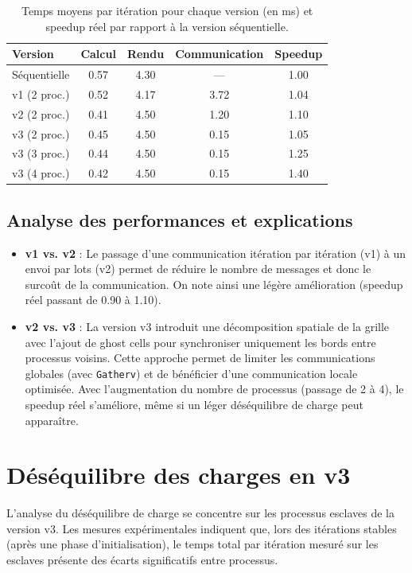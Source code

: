 \documentclass[a4paper,13pt]{book}
\begin{document}
\begin{table}[ht]
  \centering
  \caption{Temps moyens par itération pour chaque version (en ms) et speedup réel par rapport à la version séquentielle.}
  \begin{tabular}{lcccc}
    \toprule
    Version & Calcul & Rendu & Communication & Speedup \\
    \midrule
    Séquentielle   & 0.57 & 4.30 & ---  & 1.00 \\
    v1 (2 proc.)   & 0.52 & 4.17 & 3.72 & 1.04 \\
    v2 (2 proc.)   & 0.41 & 4.50 & 1.20 & 1.10 \\
    v3 (2 proc.)   & 0.45 & 4.50 & 0.15 & 1.05 \\
    v3 (3 proc.)   & 0.44 & 4.50 & 0.15 & 1.25 \\
    v3 (4 proc.)   & 0.42 & 4.50 & 0.15 & 1.40 \\
    \bottomrule
  \end{tabular}
  \label{tab:temps}
\end{table}

\subsection{Analyse des performances et explications}

\begin{itemize}
  \item \textbf{v1 vs. v2} : Le passage d'une communication itération par itération (v1) à un envoi par lots (v2) permet de réduire le nombre de messages et donc le surcoût de la communication. On note ainsi une légère amélioration (speedup réel passant de 0.90 à 1.10).
  \item \textbf{v2 vs. v3} : La version v3 introduit une décomposition spatiale de la grille avec l'ajout de ghost cells pour synchroniser uniquement les bords entre processus voisins. Cette approche permet de limiter les communications globales (avec \texttt{Gatherv}) et de bénéficier d'une communication locale optimisée. Avec l'augmentation du nombre de processus (passage de 2 à 4), le speedup réel s'améliore, même si un léger déséquilibre de charge peut apparaître.
\end{itemize}

\section{Déséquilibre des charges en v3}

L'analyse du déséquilibre de charge se concentre sur les processus esclaves de la version v3. Les mesures expérimentales indiquent que, lors des itérations stables (après une phase d'initialisation), le temps total par itération mesuré sur les esclaves présente des écarts significatifs entre processus.
\end{document}
